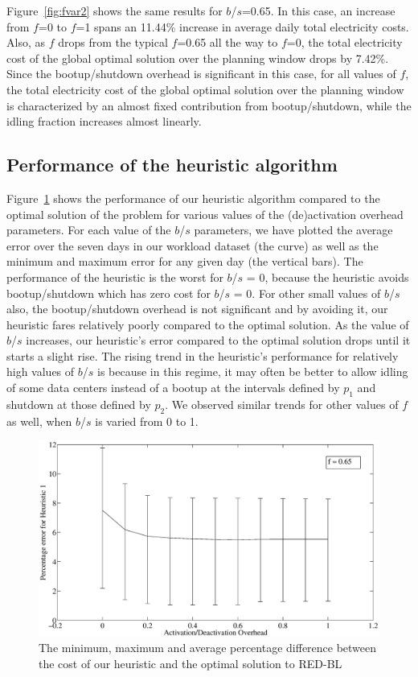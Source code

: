 Figure~\ref{fig:fvar2} shows the same results for $b$/$s$=0.65. In this case, an increase from $f$=0 to $f$=1 spans an 11.44\% increase in average daily total electricity costs. Also, as $f$ drops from the typical $f$=0.65 all the way to $f$=0, the total electricity cost of the global optimal solution over the planning window drops by 7.42\%. Since the bootup/shutdown overhead is significant in this case, for all values of $f$, the total electricity cost of the global optimal solution over the planning window is characterized by an almost fixed contribution from bootup/shutdown, while the idling fraction increases almost linearly.

\subsection{Performance of the heuristic algorithm}
Figure~\ref{fig:heur1perf} shows the performance of our heuristic algorithm compared to the optimal solution of the problem for various values of the (de)activation overhead parameters. For each value of the $b$/$s$ parameters, we have plotted the average error over the seven days in our workload dataset (the curve) as well as the minimum and maximum error for any given day (the vertical bars). The performance of the heuristic is the worst for $b$/$s$ = 0, because the heuristic avoids bootup/shutdown which has zero cost for $b$/$s$ = 0. For other small values of $b$/$s$ also, the bootup/shutdown overhead is not significant and by avoiding it, our heuristic fares relatively poorly compared to the optimal solution. As the value of $b$/$s$ increases, our heuristic's error compared to the optimal solution drops until it starts a slight rise. The rising trend in the heuristic's performance for relatively high values of $b$/$s$ is because in this regime, it may often be better to allow idling of some data centers instead of a bootup at the intervals defined by $p_1$ and shutdown at those defined by $p_2$. We observed similar trends for other values of $f$ as well, when $b$/$s$ is varied from 0 to 1.

\begin{figure}
\includegraphics[width=0.8\linewidth]{pics/rb-heur1error.eps}
\caption{The minimum, maximum and average percentage difference between the cost of our heuristic and the optimal solution to RED-BL}
\label{fig:heur1perf}
\end{figure}


